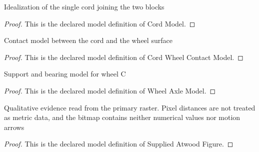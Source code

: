 \begin{definition}
  \label{def:physics:phyx-mini-0783:phyxminiproblems-problemphyxmini0783-cordmodel}
  Idealization of the single cord joining the two blocks
\end{definition}
\begin{proof}
  This is the declared model definition of Cord Model.
\end{proof}
\begin{definition}
  \label{def:physics:phyx-mini-0783:phyxminiproblems-problemphyxmini0783-cordwheelcontactmodel}
  Contact model between the cord and the wheel surface
\end{definition}
\begin{proof}
  This is the declared model definition of Cord Wheel Contact Model.
\end{proof}
\begin{definition}
  \label{def:physics:phyx-mini-0783:phyxminiproblems-problemphyxmini0783-wheelaxlemodel}
  Support and bearing model for wheel C
\end{definition}
\begin{proof}
  This is the declared model definition of Wheel Axle Model.
\end{proof}
\begin{definition}
  \label{def:physics:phyx-mini-0783:phyxminiproblems-problemphyxmini0783-suppliedatwoodfigure}
  Qualitative evidence read from the primary raster. Pixel distances are not treated as metric data, and the bitmap contains neither numerical values nor motion arrows
\end{definition}
\begin{proof}
  This is the declared model definition of Supplied Atwood Figure.
\end{proof}

